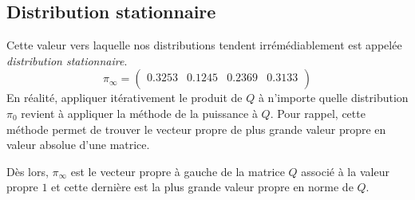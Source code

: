 \documentclass[a4paper, 12pt]{report}
\begin{document}
    \subsection{Distribution stationnaire}
    Cette valeur vers laquelle nos distributions tendent irrémédiablement est appelée \emph{distribution stationnaire}.
    \begin{equation}
        \label{eq:distribution_stationnaire}
        \pi_{\infty} =
        \begin{pmatrix}
            \num{0.3253} & \num{0.1245} & \num{0.2369} & \num{0.3133} \\
        \end{pmatrix}
    \end{equation}
    En réalité, appliquer itérativement le produit de $Q$ à n'importe quelle distribution $\pi_0$ revient à appliquer la méthode de la puissance à $Q$. Pour rappel, cette méthode permet de trouver le vecteur propre de plus grande valeur propre en valeur absolue d'une matrice. \par
    Dès lors, $\pi_{\infty}$ est le vecteur propre à gauche de la matrice $Q$ associé à la valeur propre $1$ et cette dernière est la plus grande valeur propre en norme de $Q$.
\end{document}
